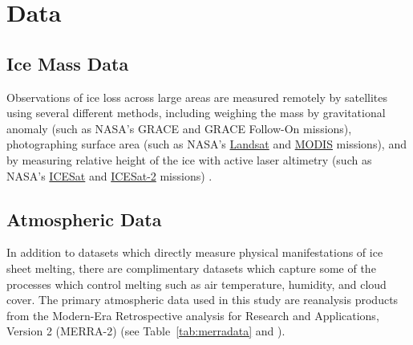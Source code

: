 \documentclass[11pt]{report}
\begin{document}
\section{Data \label{sec:data}}

\subsection{Ice Mass Data}

Observations of ice loss across large areas are measured remotely by satellites using several different methods, including weighing the mass by gravitational anomaly (such as NASA's GRACE and GRACE Follow-On missions), photographing surface area (such as NASA's \href{https://landsat.gsfc.nasa.gov}{Landsat} and \href{https://terra.nasa.gov/about/terra-instruments/modis}{MODIS} missions), and by measuring relative height of the ice with active laser altimetry (such as NASA's \href{https://icesat.gsfc.nasa.gov/icesat/}{ICESat} and \href{https://icesat-2.gsfc.nasa.gov}{ICESat-2} missions) \cite[][]{khan2015}.

 
 \subsection{Atmospheric Data}
 
 
In addition to datasets which directly measure physical manifestations of ice sheet melting, there are complimentary datasets which capture some of the processes which control melting such as air temperature, humidity, and cloud cover. The primary atmospheric data used in this study are reanalysis products from the Modern-Era Retrospective analysis for Research and Applications, Version 2 (MERRA-2) (see Table~\ref{tab:merradata} and ). 
\end{document}
